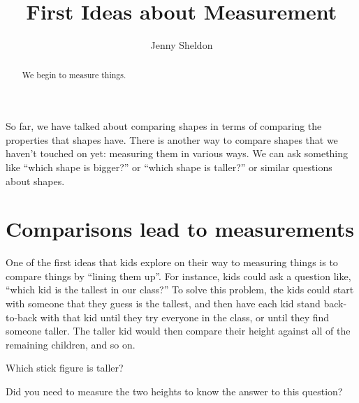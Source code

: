 \documentclass{ximera}
\title{First Ideas about Measurement}
\author{Jenny Sheldon}
\begin{document}
\begin{abstract}
We begin to measure things.
\end{abstract}
\maketitle

So far, we have talked about comparing shapes in terms of comparing the properties that shapes have. There is another way to compare shapes that we haven't touched on yet: measuring them in various ways. We can ask something like ``which shape is bigger?'' or ``which shape is taller?'' or similar questions about shapes. 

\section{Comparisons lead to measurements}
One of the first ideas that kids explore on their way to measuring things is to compare things by ``lining them up''. For instance, kids could ask a question like, ``which kid is the tallest in our class?'' To solve this problem, the kids could start with someone that they guess is the tallest, and then have each kid stand back-to-back with that kid until they try everyone in the class, or until they find someone taller. The taller kid would then compare their height against all of the remaining children, and so on.
\begin{question}
Which stick figure is taller?
\begin{image}
\end{image}
\begin{multipleChoice}
\end{multipleChoice}

Did you need to measure the two heights to know the answer to this question?
\begin{multipleChoice}
\end{multipleChoice}
\end{question}
\end{document}

